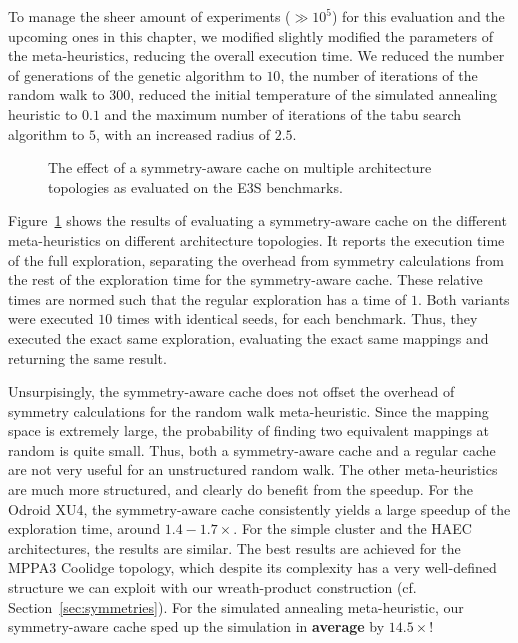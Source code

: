 To manage the sheer amount of experiments ($\gg 10^5$) for this evaluation and the upcoming ones in this chapter, we modified slightly modified the parameters of the meta-heuristics, reducing the overall execution time.
We reduced the number of generations of the genetic algorithm to $10$, the number of iterations of the random walk to $300$, reduced the initial temperature of the simulated annealing heuristic to $0.1$ and the maximum number of iterations of the tabu search algorithm to $5$, with an increased radius of $2.5$.

\begin{figure}[h]
	\centering
   \resizebox{0.95\textwidth}{!}{}
	\caption{The effect of a symmetry-aware cache on multiple architecture topologies as evaluated on the \ac{E3S} benchmarks.}
	\label{fig:symmetry_cache}
\end{figure}


Figure~\ref{fig:symmetry_cache} shows the results of evaluating a symmetry-aware cache on the different meta-heuristics on different architecture topologies.
It reports the execution time of the full exploration, separating the overhead from symmetry calculations from the rest of the exploration time for the symmetry-aware cache.
These relative times are normed such that the regular exploration has a time of $1$. Both variants were executed $10$ times with identical seeds, for each benchmark. 
Thus, they executed the exact same exploration, evaluating the exact same mappings and returning the same result.

Unsurpisingly, the symmetry-aware cache does not offset the overhead of symmetry calculations for the random walk meta-heuristic.
Since the mapping space is extremely large, the probability of finding two equivalent mappings at random is quite small. 
Thus, both a symmetry-aware cache and a regular cache are not very useful for an unstructured random walk.
The other meta-heuristics are much more structured, and clearly do benefit from the speedup.
For the Odroid XU4, the symmetry-aware cache consistently yields a large speedup of the exploration time, around $1.4-1.7 \times$.
For the simple cluster and the \ac{HAEC} architectures, the results are similar.
The best results are achieved for the MPPA3 Coolidge topology, which despite its complexity has a very well-defined structure we can exploit with our wreath-product construction (cf. Section~\ref{sec:symmetries}).
For the simulated annealing meta-heuristic, our symmetry-aware cache sped up the simulation in \textbf{average} by $14.5 \times$!

